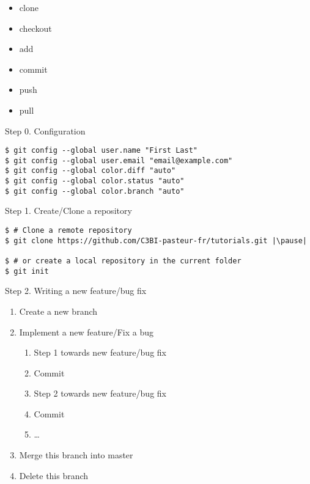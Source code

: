 \def\git#1{{\small\color{git}\$ git #1}\\}

\begin{frame}
    \begin{itemize}
        \item clone
        \item  checkout
        \item  add
        \item commit
        \item push
        \item pull
    \end{itemize}
\end{frame}

\begin{frame}[fragile]{Step 0. Configuration}
	\begin{lstlisting}
$ git config --global user.name "First Last"
$ git config --global user.email "email@example.com"
$ git config --global color.diff "auto"
$ git config --global color.status "auto"
$ git config --global color.branch "auto"
	\end{lstlisting}
\end{frame}

\begin{frame}[fragile]{Step 1. Create/Clone a repository}
	\begin{lstlisting}
$ # Clone a remote repository
$ git clone https://github.com/C3BI-pasteur-fr/tutorials.git |\pause|

$ # or create a local repository in the current folder
$ git init
	\end{lstlisting}
\end{frame}

\begin{frame}[fragile]{Step 2. Writing a new feature/bug fix}
	\begin{enumerate}
		\item Create a new branch
		\item Implement a new feature/Fix a bug
		\begin{enumerate}
			\item Step 1 towards new feature/bug fix
			\item Commit
			\item Step 2 towards new feature/bug fix
			\item Commit
			\item \ldots
		\end{enumerate}
		\item Merge this branch into master
		\item Delete this branch 
	\end{enumerate}
\end{frame}


